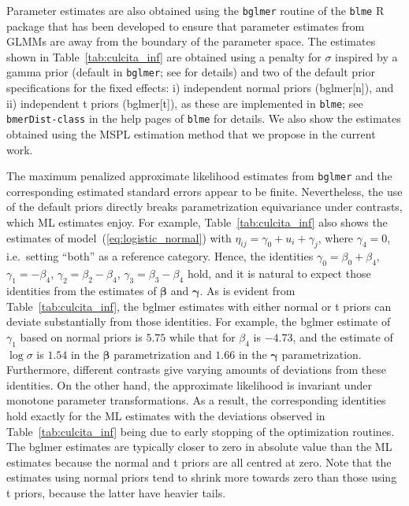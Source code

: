 \documentclass[11pt, a4paper]{article}
\newcommand*{\bb}{\boldsymbol}
\theoremstyle{example} \newtheorem{example}{Example}[section]
\theoremstyle{theorem} \newtheorem{theorem}{Theorem}[section]
\def\bbeta{\bb{\beta}}
\def\bgamma{\bb{\gamma}}
\def\bgamma{\bb{\gamma}}
\begin{document}
Parameter estimates are also obtained using the \texttt{bglmer}
routine of the \texttt{blme} R package \citep{chung+etal:2013} that
has been developed to ensure that parameter estimates from GLMMs are
away from the boundary of the parameter space. The estimates shown in
Table~\ref{tab:culcita_inf} are obtained using a penalty for $\sigma$
inspired by a gamma prior (default in \texttt{bglmer}; see
\citealt{chung+etal:2013} for details) and two of the default prior
specifications for the fixed effects: i) independent normal priors
(bglmer[n]), and ii) independent t priors (bglmer[t]), as these are
implemented in \texttt{blme}; see \texttt{bmerDist-class} in the help
pages of \texttt{blme} for details. We also show the estimates
obtained using the MSPL estimation method that we propose in the
current work.

The maximum penalized approximate likelihood estimates from
\texttt{bglmer} and the corresponding estimated standard errors appear
to be finite. Nevertheless, the use of the default priors directly
breaks parametrization equivariance under contrasts, which ML
estimates enjoy. For example, Table~\ref{tab:culcita_inf} also shows
the estimates of model~(\ref{eq:logistic_normal}) with
$\eta_{ij} = \gamma_0 + u_i + \gamma_{j}$, where $\gamma_{4} = 0$,
i.e.~setting ``both'' as a reference category. Hence, the identities
$\gamma_0 = \beta_0 + \beta_4$, $\gamma_1 = -\beta_4$,
$\gamma_2 = \beta_2 - \beta_4$, $\gamma_3 = \beta_3 - \beta_4$ hold,
and it is natural to expect those identities from the estimates of
$\bbeta$ and $\bgamma$. As is evident from
Table~\ref{tab:culcita_inf}, the bglmer estimates with either normal
or t priors can deviate substantially from those identities. For
example, the bglmer estimate of $\gamma_1$ based on normal priors is
$5.75$ while that for $\beta_4$ is $-4.73$, and the estimate of
$\log\sigma$ is $1.54$ in the $\bbeta$ parametrization and $1.66$ in
the $\bgamma$ parametrization. Furthermore, different contrasts give
varying amounts of deviations from these identities. On the other
hand, the approximate likelihood is invariant under monotone parameter
transformations. As a result, the corresponding identities hold
exactly for the ML estimates with the deviations observed in
Table~\ref{tab:culcita_inf} being due to early stopping of the
optimization routines. The bglmer estimates are typically
closer to zero in absolute value than the ML estimates because the
normal and t priors are all centred at zero. Note that the estimates
using normal priors tend to shrink more towards zero than those using
t priors, because the latter have heavier tails.
\end{document}
